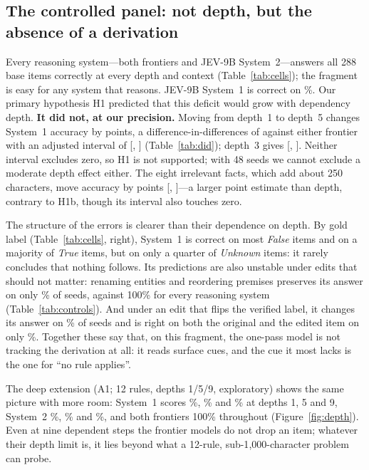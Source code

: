 \subsection{The controlled panel: not depth, but the absence of a derivation}
\label{sec:controlled-results}


Every reasoning system---both frontiers and JEV-9B System~2---answers all 288 base items correctly at every depth and context (Table~\ref{tab:cells}); the fragment is easy for any system that reasons.
JEV-9B System~1 is correct on \AccCtlSone\%.
Our primary hypothesis H1 predicted that this deficit would grow with dependency depth.
\textbf{It did not, at our precision.}
Moving from depth~1 to depth~5 changes System~1 accuracy by \ChgAstraDfive{} points, a difference-in-differences of \DidAstraDfive{} against either frontier with an adjusted interval of [\DidLoAstraDfive, \DidHiAstraDfive] (Table~\ref{tab:did}); depth~3 gives \DidAstraDthree{} [\DidLoAstraDthree, \DidHiAstraDthree].
Neither interval excludes zero, so H1 is not supported; with 48 seeds we cannot exclude a moderate depth effect either.
The eight irrelevant facts, which add about 250 characters, move accuracy by \DidAstraCtx{} points [\DidLoAstraCtx, \DidHiAstraCtx]---a larger point estimate than depth, contrary to H1b, though its interval also touches zero.

The structure of the errors is clearer than their dependence on depth.
By gold label (Table~\ref{tab:cells}, right), System~1 is correct on most \emph{False} items and on a majority of \emph{True} items, but on only a quarter of \emph{Unknown} items: it rarely concludes that nothing follows.
Its predictions are also unstable under edits that should not matter: renaming entities and reordering premises preserves its answer on only \CtlSoneInvariant\% of seeds, against 100\% for every reasoning system (Table~\ref{tab:controls}).
And under an edit that flips the verified label, it changes its answer on \CtlSoneAnswerChanged\% of seeds and is right on both the original and the edited item on only \CtlSoneBothCorrect\%.
Together these say that, on this fragment, the one-pass model is not tracking the derivation at all: it reads surface cues, and the cue it most lacks is the one for ``no rule applies''.

The deep extension (A1; 12 rules, depths 1/5/9, exploratory) shows the same picture with more room: System~1 scores \DeepSoneDOne\%, \DeepSoneDFive\% and \DeepSoneDNine\% at depths 1, 5 and 9, System~2 \DeepStwoDOne\%, \DeepStwoDFive\% and \DeepStwoDNine\%, and both frontiers 100\% throughout (Figure~\ref{fig:depth}).
Even at nine dependent steps the frontier models do not drop an item; whatever their depth limit is, it lies beyond what a 12-rule, sub-1{,}000-character problem can probe.


